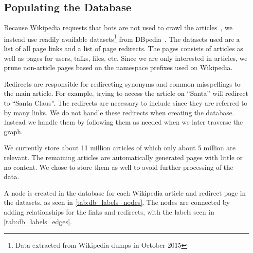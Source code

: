 \subsection{Populating the Database}\label{sec:db_populate}
Because Wikipedia requests that bots are not used to crawl the articles~\cite{wiki-bots}, we instead use readily available datasets\footnote{Data extracted from Wikipedia dumps in October 2015} from DBpedia~\cite{dbpedia}. The datasets used are a list of all page links and a list of page redirects. The pages consists of articles as well as pages for users, talks, files, etc. Since we are only interested in articles, we prune non-article pages based on the namespace prefixes used on Wikipedia.

Redirects are responsible for redirecting synonyms and common misspellings to the main article. For example, trying to access the article on ``Santa'' will redirect to ``Santa Claus''. The redirects are necessary to include since they are referred to by many links. We do not handle these redirects when creating the database. Instead we handle them by following them as needed when we later traverse the graph.

We currently store about 11 million articles of which only about 5 million are relevant. The remaining articles are automatically generated pages with little or no content. We chose to store them as well to avoid further processing of the data. 


A node is created in the database for each Wikipedia article and redirect page in the datasets, as seen in \cref{tab:db_labels_nodes}.
The nodes are connected by adding relationships for the links and redirects, with the labels seen in \cref{tab:db_labels_edges}.

